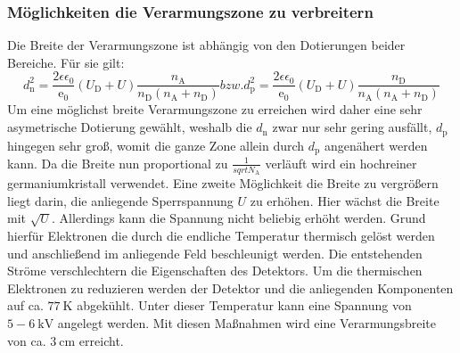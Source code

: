 \subsubsection{Möglichkeiten die Verarmungszone zu verbreitern}
Die Breite der Verarmungszone ist abhängig von den Dotierungen beider Bereiche. Für sie gilt:
\begin{equation}
    d_\text{n}^2 = \frac{2 \epsilon \epsilon_0}{\text{e}_0} (U_\text{D} + U) \frac{n_\text{A}}{n_\text{D}(n_\text{A}+n_\text{D})} bzw. d_\text{p}^2 = \frac{2\epsilon \epsilon _0}{\text{e}_0} (U_\text{D} + U) \frac{n_\text{D}}{n_\text{A}(n_\text{A}+n_\text{D})}
\end{equation}
 Um eine möglichst breite Verarmungszone zu erreichen wird daher eine sehr asymetrische Dotierung gewählt, weshalb die $d_\text{n}$ zwar nur sehr gering ausfällt, $d_\text{p}$ hingegen sehr groß, womit die ganze Zone allein durch $d_\text{p}$ angenähert werden kann. Da die Breite nun proportional zu $\frac{1}{sqrt{N_\text{A}}}$ verläuft wird ein hochreiner germaniumkristall verwendet. Eine zweite Möglichkeit die Breite zu vergrößern liegt darin, die anliegende Sperrspannung $U$ zu erhöhen. Hier wächst die Breite mit $\sqrt{U}$. Allerdings kann die Spannung nicht beliebig erhöht werden. Grund hierfür Elektronen die durch die endliche Temperatur thermisch gelöst werden und anschließend im anliegende Feld beschleunigt werden. Die entstehenden Ströme verschlechtern die Eigenschaften des Detektors. Um die thermischen Elektronen zu reduzieren werden der Detektor und die anliegenden Komponenten auf ca. $\SI{77}{\kelvin}$ abgekühlt. Unter dieser Temperatur kann eine Spannung von $5-\SI{6}{\kilo\volt}$ angelegt werden. Mit diesen Maßnahmen wird eine Verarmungsbreite von ca. $\SI{3}{\centi\meter}$ erreicht.
 
 
